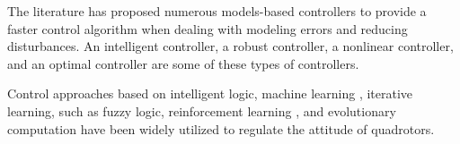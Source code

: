 \documentclass[3p,times]{elsarticle}
\begin{document}

The literature has proposed numerous models-based controllers to provide a faster control algorithm when dealing with modeling errors and reducing disturbances.
An intelligent controller, a robust controller, a nonlinear controller, and an optimal controller are some of these types of controllers.

Control approaches based on intelligent logic,
machine learning \cite{4564736},
iterative learning\cite{electronics10202474},
such as fuzzy logic\cite{9782598},
reinforcement learning \cite{app11073257},
and evolutionary computation \cite{doi:10.2514/6.2013-5098}
have been widely utilized to regulate the attitude of quadrotors.
\end{document}
